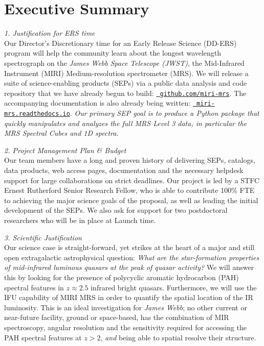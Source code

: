 \vspace{-4pt}
\section*{{\sc Executive Summary}}

\vspace{-6pt}
\noindent
{\it 1. Justification for ERS time}\\
Our Director’s Discretionary time for an Early Release Science
(DD-ERS) program will help the community learn about the longest
wavelength spectrograph on the {\it James Webb Space Telescope
(JWST)}, the Mid-Infrared Instrument (MIRI) Medium-resolution
spectrometer (MRS).  We will release a suite of science-enabling
products (SEPs) via a public data analysis and code repository that we
have already begun to build: \href{https://github.com/miri-mrs}{\tt
github.com/miri-mrs}.  The accompanying documentation is also already
being written: \href{http://miri-mrs.readthedocs.io/}{{\tt
miri-mrs.readthedocs.io}}.  {\it Our primary SEP goal is to produce a
Python package that quickly manipulates and analyzes the full MRS
Level 3 data, in particular the MRS Spectral Cubes and 1D spectra.}

\smallskip \smallskip \smallskip
\noindent
{\it 2. Project Management Plan \& Budget} \\
Our team members have a long and proven history of delivering SEPs,
catalogs, data products, web access pages, documentation and the
necessary helpdesk support for large collaborations on strict
deadlines.  Our project is led by a STFC Ernest Rutherford Senior
Research Fellow, who is able to contribute 100\% FTE to achieving the
major science goals of the proposal, as well as leading the initial
development of the SEPs. We also ask for support for two postdoctoral
researchers who will be in place at Launch time.

\smallskip \smallskip \smallskip
\noindent
{\it 3. Scientific Justification}\\
Our science case is straight-forward, yet strikes at the heart of a
major and still open extragalactic astrophysical question: {\it What
are the star-formation properties of mid-infrared luminous quasars at
the peak of quasar activity? } We will answer this by looking for the
presence of polycyclic aromatic hydrocarbon (PAH) spectral features in
$z\approx2.5$ infrared bright quasars.  Furthermore, we will use the
IFU capability of MIRI MRS in order to quantify the spatial location
of the IR luminosity. This is an ideal investigation for {\it James
Webb}; no other current or near-future facility, ground or
space-based, has the combination of MIR spectroscopy, angular
resolution and the sensitivity required for accessing the PAH spectral
features at $z>2$, {\it and} being able to spatial resolve their
structure.


